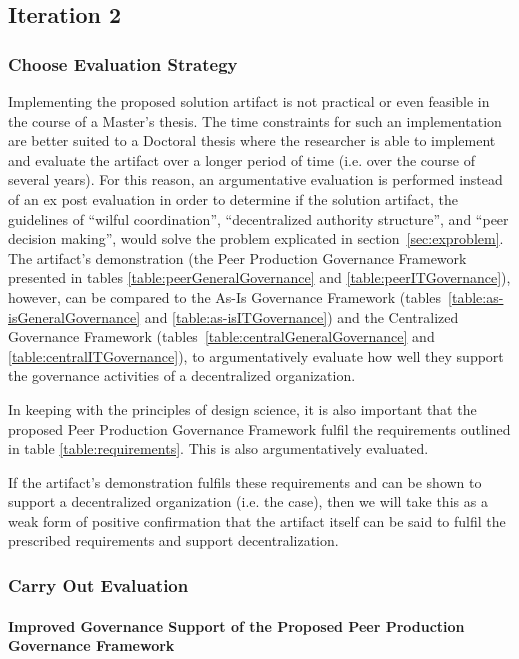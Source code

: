 \subsection{Iteration 2}
\subsubsection*{Choose Evaluation Strategy}

Implementing the proposed solution artifact is not practical or even feasible in the course of a Master's thesis. The time constraints for such an implementation are better suited to a Doctoral thesis where the researcher is able to implement and evaluate the artifact over a longer period of time (i.e. over the course of several years). For this reason, an argumentative evaluation is performed instead of an ex post evaluation in order to determine if the solution artifact, the guidelines of ``wilful coordination'', ``decentralized authority structure'', and ``peer decision making'', would solve the problem explicated in section~\ref{sec:exproblem}. The artifact's demonstration (the Peer Production Governance Framework presented in tables \ref{table:peerGeneralGovernance} and \ref{table:peerITGovernance}), however, can be compared to the As-Is Governance Framework (tables~\ref{table:as-isGeneralGovernance} and \ref{table:as-isITGovernance}) and the Centralized Governance Framework (tables~\ref{table:centralGeneralGovernance}  and \ref{table:centralITGovernance}), to argumentatively evaluate how well they support the governance activities of a decentralized organization. 

In keeping with the principles of design science, it is also important that the proposed Peer Production Governance Framework fulfil the requirements outlined in table \ref{table:requirements}. This is also argumentatively evaluated. 

If the artifact's demonstration fulfils these requirements and can be shown to support a decentralized organization (i.e. the case), then we will take this as a weak form of positive confirmation  that the artifact itself can be said to fulfil the prescribed requirements and support decentralization.

\subsubsection*{Carry Out Evaluation}

\paragraph*{Improved Governance Support of the Proposed Peer Production Governance Framework}

